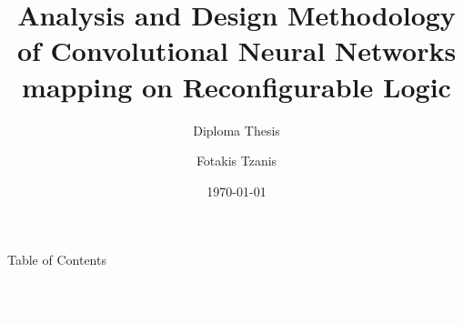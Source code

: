 \documentclass[aspectratio=169]{beamer}
\title[Diploma Thesis]{Analysis and Design Methodology of Convolutional Neural Networks\\ mapping on Reconfigurable Logic}
\subtitle{Diploma Thesis}
\author{Fotakis Tzanis}
\institute[Technical University of Crete]{Electrical \& Computer Engineering School\\Technical University of Crete}
\date[\today]{\today}
\begin{document}
\begin{frame}
	\titlepage
\end{frame}

\begin{frame}{Table of Contents}
	\tableofcontents
\end{frame}









% 
% 
% 
% 
% 
% 

\begin{frame}[plain, b]
	\centering
	\huge \textcolor{white}{Thank You!}\\
	\large \textcolor{white}{Any Questions?}
	\normalsize
	\vspace*{\fill}
\end{frame}
\end{document}
